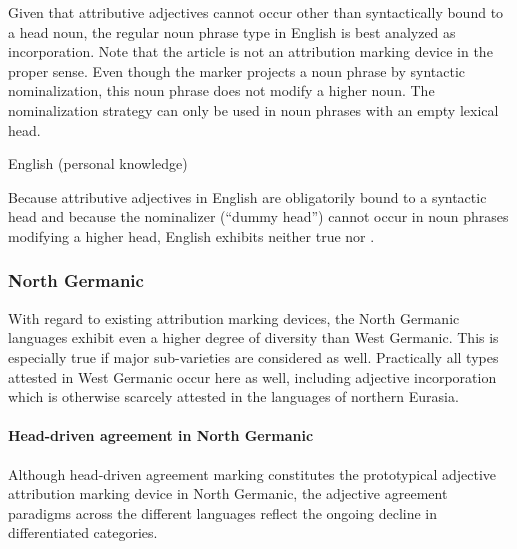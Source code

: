Given that attributive adjectives cannot occur other than syntactically bound to a head noun, the regular noun phrase type in English is best analyzed as incorporation. Note that the article is not an attribution marking device in the proper sense. Even though the marker projects a noun phrase by syntactic nominalization, this noun phrase does not modify a higher noun. The nominalization strategy can only be used in noun phrases with an empty lexical head.
\begin{exe}
\ex \rm{English (personal knowledge)}
\begin{xlist}
\end{xlist}
\end{exe}
Because attributive adjectives in English are obligatorily bound to a syntactic head and because the nominalizer (“dummy head”) cannot occur in noun phrases modifying a higher head, English exhibits neither true  nor .

\subsubsection{North Germanic}
\label{n-germanic synchr}
With regard to existing attribution marking devices, the North Germanic languages exhibit even a higher degree of diversity than West Germanic. This is especially true if major sub-varieties are considered as well. Practically all types attested in West Germanic occur here as well, including adjective incorporation which is otherwise scarcely attested in the languages of northern Eurasia.

\paragraph*{Head\hyp{}driven agreement in North Germanic} 
Although head\hyp{}driven agreement marking constitutes the prototypical adjective attribution marking device in North Germanic, the adjective agreement paradigms across the different languages reflect the ongoing decline in differentiated categories.

